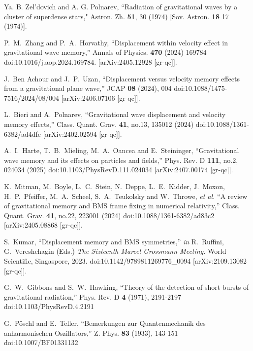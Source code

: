 \documentclass[preprint,showpacs,preprintnumbers,amsmath,amssymb,nofootinbib]{revtex4}
\begin{document}
\begin{thebibliography}{99}

Ya. B. Zel'dovich and A. G. Polnarev,
``Radiation of gravitational waves by a cluster of superdense stars,"
Astron. Zh. {\bf 51}, 30 (1974)
[Sov. Astron. {\bf 18} 17 (1974)].

P.~M.~Zhang and P.~A.~Horvathy,
``Displacement within velocity effect in gravitational wave memory,''
Annals of Physics. \textbf{470} (2024) 169784 doi:10.1016/j.aop.2024.169784. [arXiv:2405.12928 [gr-qc]].


J.~Ben Achour and J.~P.~Uzan,
``Displacement versus velocity memory effects from a gravitational plane wave,''
JCAP \textbf{08} (2024), 004
doi:10.1088/1475-7516/2024/08/004
[arXiv:2406.07106 [gr-qc]].

L.~Bieri and A.~Polnarev,
``Gravitational wave displacement and velocity memory effects,''
Class. Quant. Grav. \textbf{41}, no.13, 135012 (2024)
doi:10.1088/1361-6382/ad4dfe
[arXiv:2402.02594 [gr-qc]].

A.~I.~Harte, T.~B.~Mieling, M.~A.~Oancea and E.~Steininger,
``Gravitational wave memory and its effects on particles and fields,''
Phys. Rev. D \textbf{111}, no.2, 024034 (2025)
doi:10.1103/PhysRevD.111.024034
[arXiv:2407.00174 [gr-qc]].

K.~Mitman, M.~Boyle, L.~C.~Stein, N.~Deppe, L.~E.~Kidder, J.~Moxon, H.~P.~Pfeiffer, M.~A.~Scheel, S.~A.~Teukolsky and W.~Throwe, \textit{et al.}
``A review of gravitational memory and BMS frame fixing in numerical relativity,''
Class. Quant. Grav. \textbf{41}, no.22, 223001 (2024)
doi:10.1088/1361-6382/ad83c2
[arXiv:2405.08868 [gr-qc]].

S.~Kumar,
``Displacement memory and BMS symmetries,''
{\it in} R.~Ruffini, G.~Vereshchagin (Eds.) {\sl The Sixteenth Marcel Grossmann Meeting.}
World Scientific, Singaspore, 2023.
doi:10.1142/9789811269776\_0094
[arXiv:2109.13082 [gr-qc]].

G.~W.~Gibbons and S.~W.~Hawking,
``Theory of the detection of short bursts of gravitational radiation,'' Phys. Rev. D \textbf{4} (1971), 2191-2197
doi:10.1103/PhysRevD.4.2191


G.~P\"oschl and E.~Teller,
``Bemerkungen zur Quantenmechanik des anharmonischen Oszillators,''
Z. Phys. \textbf{83} (1933), 143-151
doi:10.1007/BF01331132


\end{thebibliography}
\end{document}
